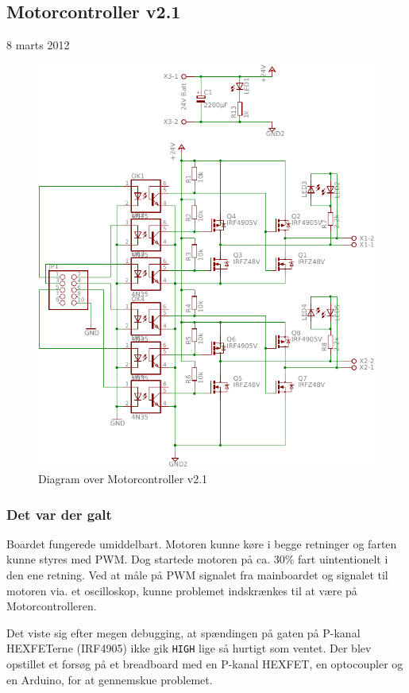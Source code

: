 \documentclass[a4paper,oneside,article,danish,table]{memoir}
\newcommand{\boarddate}[1]{\textcolor{blue!80!black}{#1}}
\begin{document}
\subsection{Motorcontroller v2.1}
\boarddate{8 marts 2012}
\begin{figure}[htbp]
  \centering
  \includegraphics[width=\textwidth]{pictures/MotorcontrollerSch2-1.pdf}
  \caption{Diagram over Motorcontroller v2.1}
  \label{fig:mosch2.1}
\end{figure}
\subsubsection{Det var der galt}
Boardet fungerede umiddelbart. Motoren kunne køre i begge retninger og farten kunne styres med PWM. Dog startede motoren på ca. 30\% fart uintentionelt i den ene retning. Ved at måle på PWM signalet fra mainboardet og signalet til motoren via. et oscilloskop, kunne problemet indskrænkes til at være på Motorcontrolleren.

Det viste sig efter megen debugging, at spændingen på gaten på P-kanal HEXFETerne (IRF4905) ikke gik \texttt{HIGH} lige så hurtigt som ventet. Der blev opstillet et forsøg på et breadboard med en P-kanal HEXFET, en optocoupler og en Arduino, for at gennemskue problemet.
\end{document}
